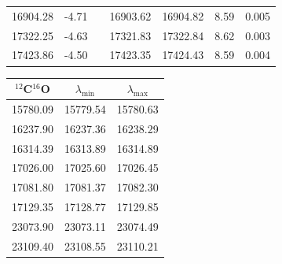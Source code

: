 \documentclass{article}
\begin{document}
\begin{table}[h!]
\begin{center}
\begin{tabular}{ccccccc}
16904.28 & -4.71& & 16903.62&16904.82& 8.59&0.005\\
17322.25 & -4.63& & 17321.83&17322.84& 8.62&0.003\\
17423.86 & -4.50& & 17423.35&17424.43& 8.59&0.004\\
        \hline
        \end{tabular} \par
        \vspace{1cm}
        \begin{tabular}{ccc}
          \hline
          \hline
          $^{12}$C$^{16}$O & $\lambda_{\mathrm{min}}$ & $\lambda_{\mathrm{max}}$ \\
          \hline
          15780.09 & 15779.54 & 15780.63 \\
          16237.90 & 16237.36 & 16238.29 \\
          16314.39 & 16313.89 & 16314.89 \\
          17026.00 & 17025.60 & 17026.45 \\
          17081.80 & 17081.37 & 17082.30 \\
          17129.35 & 17128.77 & 17129.85 \\
          23073.90 & 23073.11 & 23074.49 \\
          23109.40 & 23108.55 & 23110.21 \\
          \hline
          \end{tabular}
    \end{center} 
    \hspace{2.0cm}
 

\end{table}
\end{document}
